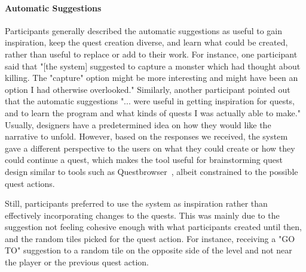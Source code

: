 \paragraph{Automatic Suggestions}

Participants generally described the automatic suggestions as useful to gain inspiration, keep the quest creation diverse, and learn what could be created, rather than useful to replace or add to their work. For instance, one participant said that "[the system] suggested to capture a monster which had thought about killing. The "capture" option might be more interesting and might have been an option I had otherwise overlooked." Similarly, another participant pointed out that the automatic suggestions "... were useful in getting inspiration for quests, and to learn the program and what kinds of quests I was actually able to make." Usually, designers have a predetermined idea on how they would like the narrative to unfold. However, based on the responses we received, the system gave a different perspective to the users on what they could create or how they could continue a quest, which makes the tool useful for brainstorming quest design similar to tools such as Questbrowser~, albeit constrained to the possible quest actions.

Still, participants preferred to use the system as inspiration rather than effectively incorporating changes to the quests. This was mainly due to the suggestion not feeling cohesive enough with what participants created until then, and the random tiles picked for the quest action. For instance, receiving a "GO TO" suggestion to a random tile on the opposite side of the level and not near the player or the previous quest action.




